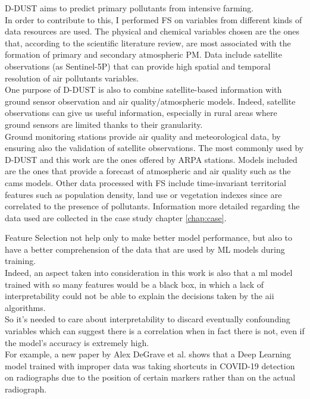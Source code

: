 \par
D-DUST aims to predict primary pollutants from intensive farming.\\ 
In order to contribute to this, I performed FS on variables from different kinds of data resources are used.
The physical and chemical variables chosen are the ones that, according to the scientific literature review, are most associated with the formation of primary and secondary atmospheric PM. 
Data include satellite observations (as Sentinel-5P) that can provide high spatial and temporal resolution of air pollutants variables. \\
One purpose of D-DUST is also to combine satellite-based information with ground sensor observation and air quality/atmospheric models. Indeed, satellite observations can give us useful information, especially in rural areas where ground sensors are limited thanks to their granularity.\\
Ground monitoring stations provide air quality and meteorological data, by ensuring also the validation of satellite observations.
The most commonly used by D-DUST and this work are the ones offered by ARPA stations.
Models included are the ones that provide a forecast of atmospheric and air quality such as the \gls{cams} models.
Other data processed with FS include time-invariant territorial features such as population density, land use or vegetation indexes since are correlated to the presence of pollutants.
Information more detailed regarding the data used are collected in the case study chapter \ref{chap:case}.
\par
Feature Selection not help only to make better model performance, but also to have a better comprehension of the data that are used by ML models during training.\\ 
Indeed, an aspect taken into consideration in this work is also that a \acrshort{ml} model trained with so many features would be a black box, in which a lack of interpretability could not be able to explain the decisions taken by the \gls{aii} algorithms.\\
So it's needed to care about interpretability to discard eventually confounding variables which can suggest there is a correlation when in fact there is not, even if the model's accuracy is extremely high.\\
For example, a new paper by Alex DeGrave et al. \cite{degrave2021ai} shows that a Deep Learning model trained with improper data was taking shortcuts in COVID-19 detection on radiographs due to the position of certain markers rather than on the actual radiograph.
